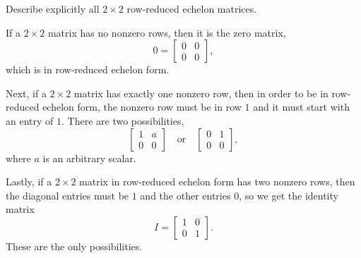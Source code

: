  Describe explicitly all $2\times2$ row-reduced echelon
matrices.
\begin{solution}
  If a $2\times2$ matrix has no nonzero rows, then it is the zero matrix,
  \begin{equation*}
    0 =
    \begin{bmatrix}
      0 & 0 \\
      0 & 0
    \end{bmatrix},
  \end{equation*}
  which is in row-reduced echelon form.

  Next, if a $2\times2$ matrix has exactly one nonzero row, then in
  order to be in row-reduced echelon form, the nonzero row must be in
  row $1$ and it must start with an entry of $1$. There are two
  possibilities,
  \begin{equation*}
    \begin{bmatrix}
      1 & a \\
      0 & 0
    \end{bmatrix}
    \quad\text{or}\quad
    \begin{bmatrix}
      0 & 1 \\
      0 & 0
    \end{bmatrix},
  \end{equation*}
  where $a$ is an arbitrary scalar.

  Lastly, if a $2\times2$ matrix in row-reduced echelon form has two
  nonzero rows, then the diagonal entries must be $1$ and the other
  entries $0$, so we get the identity matrix
  \begin{equation*}
    I =
    \begin{bmatrix}
      1 & 0 \\
      0 & 1
    \end{bmatrix}.
  \end{equation*}
  These are the only possibilities.
\end{solution}

